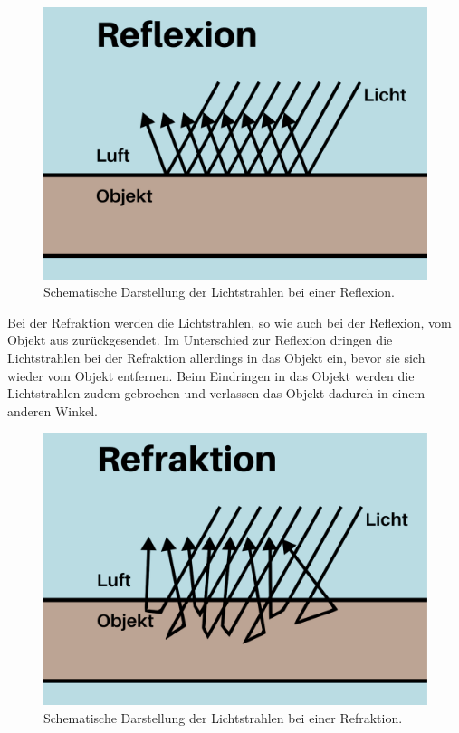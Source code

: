 \documentclass[
]{book}
\let\oldmarginnote\marginnote
\renewcommand{\marginnote}[1]{%
  \oldmarginnote{{\footnotesize\selectfont #1}}%
}
\begin{document}
\begin{figure}

\includegraphics{Chapters/Images/Chapter_19/19_7_Reflexion.png}

\caption{\label{fig-1_7}Schematische Darstellung der Lichtstrahlen bei
einer Reflexion.}

\end{figure}%

\marginnote{Refraktion}

Bei der Refraktion werden die Lichtstrahlen, so wie auch bei der
Reflexion, vom Objekt aus zurückgesendet. Im Unterschied zur Reflexion
dringen die Lichtstrahlen bei der Refraktion allerdings in das Objekt
ein, bevor sie sich wieder vom Objekt entfernen. Beim Eindringen in das
Objekt werden die Lichtstrahlen zudem gebrochen und verlassen das Objekt
dadurch in einem anderen Winkel.

\begin{figure}

\includegraphics{Chapters/Images/Chapter_19/19_8_Refraction.png}

\caption{\label{fig-1_8}Schematische Darstellung der Lichtstrahlen bei
einer Refraktion.}

\end{figure}%
\end{document}
